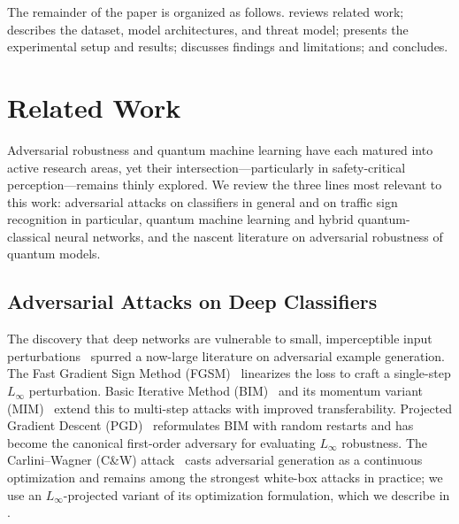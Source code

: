 \documentclass[11pt]{article}
\begin{document}
The remainder of the paper is organized as follows. 
reviews related work;  describes the dataset, model
architectures, and threat model;  presents the
experimental setup and results;  discusses findings
and limitations; and  concludes.

\section{Related Work}
\label{sec:related}

Adversarial robustness and quantum machine learning have each matured into
active research areas, yet their intersection---particularly in
safety-critical perception---remains thinly explored. We review the three
lines most relevant to this work: adversarial attacks on classifiers in
general and on traffic sign recognition in particular, quantum machine
learning and hybrid quantum-classical neural networks, and the nascent
literature on adversarial robustness of quantum models.

\subsection{Adversarial Attacks on Deep Classifiers}
\label{sec:related:attacks}

The discovery that deep networks are vulnerable to small, imperceptible
input perturbations~\cite{szegedy2014intriguing,goodfellow2015fgsm} spurred
a now-large literature on adversarial example generation. The Fast Gradient
Sign Method (FGSM)~\cite{goodfellow2015fgsm} linearizes the loss to craft a
single-step $L_\infty$ perturbation. Basic Iterative Method
(BIM)~\cite{kurakin2017adversarial} and its momentum variant
(MIM)~\cite{dong2018mim} extend this to multi-step attacks with improved
transferability. Projected Gradient Descent (PGD)~\cite{madry2018pgd}
reformulates BIM with random restarts and has become the canonical
first-order adversary for evaluating $L_\infty$ robustness. The
Carlini--Wagner (C\&W) attack~\cite{carlini2017cw} casts adversarial
generation as a continuous optimization and remains among the strongest
white-box attacks in practice; we use an $L_\infty$-projected variant of
its optimization formulation, which we describe in .
\end{document}
